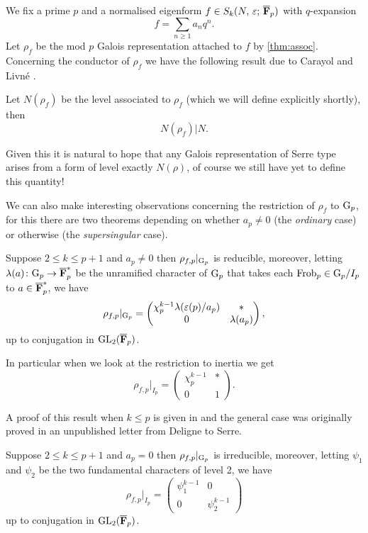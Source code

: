 \documentclass[a4paper,12pt]{article}
\begin{document}
We fix a prime $p$ and a normalised eigenform $f \in S_k(N,\,\varepsilon;\,\overline{\mathbf{F}}_p)$ with $q$-expansion
\[
f = \sum_{n\ge 1} a_nq^n.
\]
Let $\rho_f$ be the mod $p$ Galois representation attached to $f$ by \cref{thm:assoc}.
Concerning the conductor of $\rho_f$ we have the following result due to Carayol and Livn\'e \cite{Carayol, Livne}.

\begin{thm}\label{thm:level}
Let $N(\rho_f)$ be the level associated to $\rho_f$ (which we will define explicitly shortly), then
\[
N(\rho_f)|N.
\]
\end{thm}

Given this it is natural to hope that any Galois representation of Serre type arises from a form of level exactly $N(\rho)$, of course we still have yet to define this quantity!

We can also make interesting observations concerning the restriction of $\rho_f$ to $\mathrm{G}_p$, for this there are two theorems depending on whether $a_p \ne 0$ (the \emph{ordinary} case) or otherwise (the \emph{supersingular} case).

\begin{thm}[Deligne]\label{thm:ordinary}
Suppose $2\le k\le p+1$ and $a_p \ne 0$ then $\rho_{f,p}|_{\mathrm{G}_p}$ is reducible, moreover, letting $\lambda(a)\colon \mathrm{G}_p \to \overline{\mathbf{F}}_p^*$ be the unramified character of $\mathrm{G}_p$ that takes each $\operatorname{Frob}_p \in \mathrm{G}_p /I_p$ to $a\in\overline{\mathbf{F}}_p^*$, we have
\[
\rho_{f,p}|_{\mathrm{G}_p} = \begin{pmatrix} \chi_p^{k-1}\lambda(\varepsilon(p)/a_p) & * \\ 0 & \lambda(a_p)\end{pmatrix},
\]
up to conjugation in $\operatorname{GL}_2(\overline{\mathbf{F}}_p)$.

In particular when we look at the restriction to inertia we get
\[
\rho_{f,p}|_{I_{p}} = \begin{pmatrix} \chi_p^{k-1} & * \\ 0 & 1\end{pmatrix}.
\]
\end{thm}

A proof of this result when $k \le p$ is given in \cite{Gross} and the general case was originally proved in an unpublished letter from Deligne to Serre.

\begin{thm}[Fontaine]\label{thm:super}
Suppose $2\le k \le p +1$ and $a_p = 0$ then $\rho_{f,p}|_{\mathrm{G}_p}$ is irreducible, moreover, letting $\psi_1$ and $\psi_2$ be the two fundamental characters of level 2, we have
\[
\rho_{f,p}|_{I_p} = \begin{pmatrix} \psi_1^{k-1} & 0 \\ 0 & \psi_2^{k-1}\end{pmatrix}
\]
up to conjugation in $\operatorname{GL}_2(\overline{\mathbf{F}}_p)$.
\end{thm}
\end{document}
